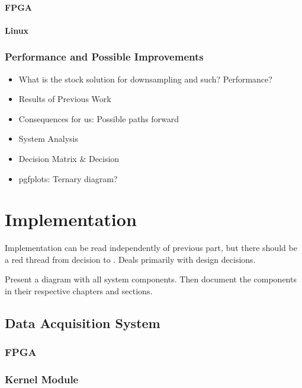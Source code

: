 \documentclass[a4paper,oneside]{alpenthesis/alpenthesis}
\begin{document}
\subsection{FPGA}
\subsection{Linux}

\section{Performance and Possible Improvements}
\begin{itemize}
    \item
    What is the stock solution for downsampling and such? Performance?
    \item
    Results of Previous Work
    \item
    Consequences for us: Possible paths forward
    \item
    System Analysis
    \item 
    Decision Matrix \& Decision
    \item
    pgfplots: Ternary diagram?
\end{itemize}



\part{Implementation} %
\label{part:Implementation}
Implementation can be read independently of previous part, but there should be
a  red thread  from decision  to . Deals  primarily with
design decisions.

Present a diagram with all  system components. Then document the components in
their respective chapters and sections.

\chapter{Data Acquisition System}
\label{ch:data_acquisition_system}
\section{FPGA}
\section{Kernel Module}
\end{document}
